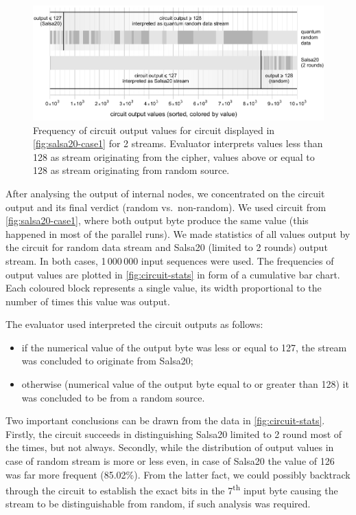 \documentclass[12pt,oneside]{fithesis2}		%
\renewcommand{\_}{\leavevmode \kern0.0em\vbox{\hrule width0.4em}}
\newcommand{\squarebullet}{\textcolor{black}{\raisebox{0.15em}{\rule{4pt}{4pt}}}}
\newenvironment{myItemize}{
  \begin{itemize}[leftmargin=2em,rightmargin=1em,itemsep=\parskip ,parsep=0em,topsep=0em,partopsep=0em]
  \renewcommand{\labelitemi}{\squarebullet}
  \renewcommand{\labelitemii}{$\diamond$}
}{
  \end{itemize}
}
\begin{document}
\begin{figure}[t!]
\centering
\includegraphics[width=\textwidth]{images/circuit-stats}
\caption{Frequency of circuit output values for circuit displayed in \autoref{fig:salsa20-case1} for 2 streams. Evaluator interprets
values less than 128 as stream originating from the cipher, values above or equal to 128 as stream originating from random source.}
\label{fig:circuit-stats}
\end{figure}

After analysing the output of internal nodes, we concentrated on the circuit output and its final verdict (random vs.\ non-random).
We used circuit from \autoref{fig:salsa20-case1}, where both output byte produce the same value (this happened in most of the
parallel runs).
We made statistics of all values output by the circuit for random data stream and Salsa20 (limited to 2 rounds) output stream.
In both cases, 1\,000\,000 input sequences were used. The frequencies of output values are plotted in \autoref{fig:circuit-stats}
in form of a cumulative bar chart. Each coloured block represents a single value, its width proportional to the number of times
this value was output. 

\noindent
The evaluator used interpreted the circuit outputs as follows:
\begin{myItemize}
\item if the numerical value of the output byte was less or equal to 127, the stream was concluded to originate from Salsa20;
\item otherwise (numerical value of the output byte equal to or greater than 128) it was concluded to be from a random source.
\end{myItemize}

\noindent
Two important conclusions can be drawn from the data in \autoref{fig:circuit-stats}. Firstly, the circuit succeeds in distinguishing
Salsa20 limited to 2 round most of the times, but not always. Secondly, while the distribution of output values in case of random
stream is more or less even, in case of Salsa20 the value of 126 was far more frequent (85.02\%). From the latter fact, we could
possibly backtrack through the circuit to establish the exact bits in the 7\textsuperscript{th} input byte causing the
stream to be distinguishable from random, if such analysis was required.
\end{document}
